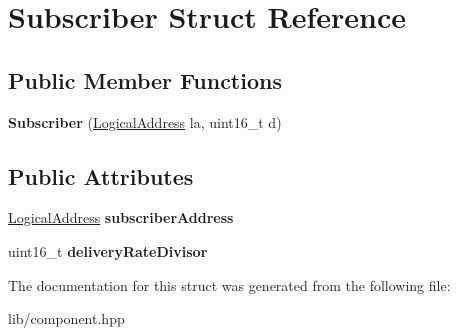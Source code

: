 \hypertarget{structSubscriber}{}\section{Subscriber Struct Reference}
\label{structSubscriber}
\subsection*{Public Member Functions}
\begin{DoxyCompactItemize}
\item 
\mbox{\label{structSubscriber_a64dab4d8803d8814bf7a6e7162a2b436}} 
{\bfseries Subscriber} (\hyperlink{structLogicalAddress}{Logical\+Address} la, uint16\+\_\+t d)
\end{DoxyCompactItemize}
\subsection*{Public Attributes}
\begin{DoxyCompactItemize}
\item 
\mbox{\label{structSubscriber_ad27b381f3d2a33920ff6664e4013abc3}} 
\hyperlink{structLogicalAddress}{Logical\+Address} {\bfseries subscriber\+Address}
\item 
\mbox{\label{structSubscriber_a8221a4d1ba53e0407b27e44cda4a87ab}} 
uint16\+\_\+t {\bfseries delivery\+Rate\+Divisor}
\end{DoxyCompactItemize}


The documentation for this struct was generated from the following file\+:\begin{DoxyCompactItemize}
\item 
lib/component.\+hpp\end{DoxyCompactItemize}
